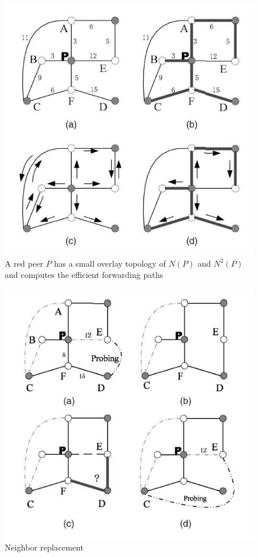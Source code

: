 \documentclass[a4paper,10pt]{article}
\begin{document}
\begin{figure}
\centering
  \includegraphics[scale=0.4]{img/sbo_efficient_forward.jpeg}
\caption{A red peer $P$ has a small overlay topology of $N(P)$ and $N^2(P)$ and computes the efficient forwarding paths}
\label{figure:sbo_efficient_forward}
\end{figure}

\begin{figure}
\centering
  \includegraphics[scale=0.4]{img/sbo_neighbour_replace.jpeg}
\caption{Neighbor replacement}
\label{figure:sbo_neighbour_replace}
\end{figure}
\end{document}
